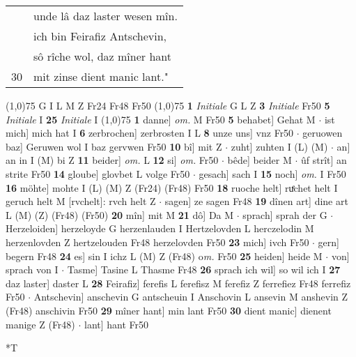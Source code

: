 \documentclass[8pt,a4paper,notitlepage]{article}
\begin{document}
\begin{table}[ht]
\begin{minipage}[t]{0.5\linewidth}
\begin{tabular}{rl}
 & unde lâ daz laster wesen mîn.\\ 
 & ich bin Feirafiz Antschevin,\\ 
 & sô rîche wol, daz mîner hant\\ 
30 & mit zinse dient manic lant."\\ 
\end{tabular}
\scriptsize
\line(1,0){75} \newline
G I L M Z Fr24 Fr48 Fr50 \newline
\line(1,0){75} \newline
\textbf{1} \textit{Initiale} G L Z  \textbf{3} \textit{Initiale} Fr50  \textbf{5} \textit{Initiale} I  \textbf{25} \textit{Initiale} I  \newline
\line(1,0){75} \newline
\textbf{1} danne] \textit{om.} M Fr50 \textbf{5} behabet] Gehat M  $\cdot$ ist mich] mich hat I \textbf{6} zerbrochen] zerbrosten I L \textbf{8} unze uns] vnz Fr50  $\cdot$ geruowen baz] Geruwen wol I baz gervwen Fr50 \textbf{10} bî] mit Z  $\cdot$ zuht] zuhten I (L) (M)  $\cdot$ an] an in I (M) bi Z \textbf{11} beider] \textit{om.} L \textbf{12} si] \textit{om.} Fr50  $\cdot$ bêde] beider M  $\cdot$ ûf strît] an strite Fr50 \textbf{14} gloube] glovbet L volge Fr50  $\cdot$ gesach] sach I \textbf{15} noch] \textit{om.} I Fr50 \textbf{16} möhte] mohte I (L) (M) Z (Fr24) (Fr48) Fr50 \textbf{18} ruoche helt] ruͤchet helt I geruch helt M [rvchelt]: rvch helt Z  $\cdot$ sagen] ze sagen Fr48 \textbf{19} dînen art] dine art L (M) (Z) (Fr48) (Fr50) \textbf{20} mîn] mit M \textbf{21} dô] Da M  $\cdot$ sprach] sprah der G  $\cdot$ Herzeloiden] herzeloyde G herzenlauden I Hertzelovden L herczelodin M herzenlovden Z hertzelouden Fr48 herzelovden Fr50 \textbf{23} mich] ivch Fr50  $\cdot$ gern] begern Fr48 \textbf{24} es] sin I ichz L (M) Z (Fr48) o\textit{m. } Fr50 \textbf{25} heiden] heide M  $\cdot$ von] sprach von I  $\cdot$ Tasme] Tasine L Thasme Fr48 \textbf{26} sprach ich wil] so wil ich I \textbf{27} daz laster] daster L \textbf{28} Feirafiz] ferefis L ferefisz M ferefiz Z ferrefiez Fr48 ferrefiz Fr50  $\cdot$ Antschevin] anschevin G antscheuin I Anschovin L ansevin M anshevin Z (Fr48) anschivin Fr50 \textbf{29} mîner hant] min lant Fr50 \textbf{30} dient manic] dienent manige Z (Fr48)  $\cdot$ lant] hant Fr50 \newline
\end{minipage}
\hspace{0.5cm}
\begin{minipage}[t]{0.5\linewidth}
\small
\begin{center}*T

\end{center}
\end{minipage}
\end{table}
\end{document}
